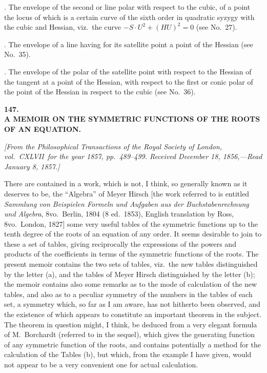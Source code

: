 \documentclass[11pt]{article}
\begin{document}
\medskip

. The envelope of the second or line polar with respect to the cubic, of a point the locus of which is a certain curve of the sixth order in quadratic syzygy with the cubic and Hessian, viz.\ the curve $-S \cdot U^2 + (HU)^2 = 0$ (see No.~27).

\medskip

. The envelope of a line having for its satellite point a point of the Hessian (see No.~35).

\medskip

. The envelope of the polar of the satellite point with respect to the Hessian of the tangent at a point of the Hessian, with respect to the first or conic polar of the point of the Hessian in respect to the cubic (see No.~36).

\bigskip

\begin{center}
{\Large\bfseries 147.}\\[1ex]
{\large\bfseries A MEMOIR ON THE SYMMETRIC FUNCTIONS OF THE ROOTS\\OF AN EQUATION.}
\end{center}

\noindent\textit{[From the Philosophical Transactions of the Royal Society of London, vol.~CXLVII\ for the year 1857, pp.~489--499. Received December 18, 1856,---Read January 8, 1857.]}

\medskip

\noindent There are contained in a work, which is not, I think, so generally known as it deserves to be, the ``Algebra'' of Meyer Hirsch [the work referred to is entitled \textit{Sammlung von Beispielen Formeln und Aufgaben aus der Buchstabenrechnung und Algebra}, 8vo.\ Berlin, 1804 (8 ed.\ 1853), English translation by Ross, 8vo.\ London, 1827] some very useful tables of the symmetric functions up to the tenth degree of the roots of an equation of any order. It seems desirable to join to these a set of tables, giving reciprocally the expressions of the powers and products of the coefficients in terms of the symmetric functions of the roots. The present memoir contains the two sets of tables, viz.\ the new tables distinguished by the letter (a), and the tables of Meyer Hirsch distinguished by the letter (b); the memoir contains also some remarks as to the mode of calculation of the new tables, and also as to a peculiar symmetry of the numbers in the tables of each set, a symmetry which, so far as I am aware, has not hitherto been observed, and the existence of which appears to constitute an important theorem in the subject. The theorem in question might, I think, be deduced from a very elegant formula of M.~Borchardt (referred to in the sequel), which gives the generating function of any symmetric function of the roots, and contains potentially a method for the calculation of the Tables (b), but which, from the example I have given, would not appear to be a very convenient one for actual calculation.
\end{document}
